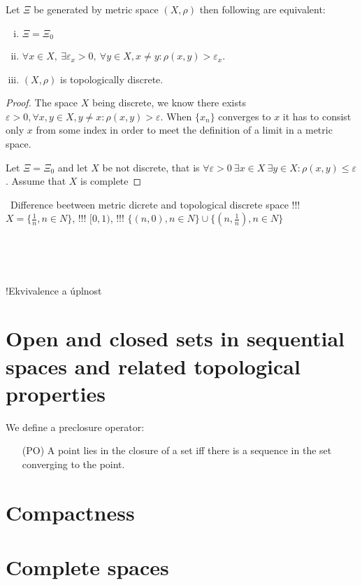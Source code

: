 \begin{theorem} \label{th:xieqxi0}
Let $\Xi$ be generated by metric space $(X,\rho)$ then following are equivalent:
\begin{enumerate}[(i)]
	\item $\Xi=\Xi_0$
	\item $\forall x\in X,\ \exists \varepsilon_x>0,\ \forall y\in X, x\neq y: \rho(x,y)>\varepsilon_x$.
	\item $(X,\rho)$ is topologically discrete.
\end{enumerate}
\end{theorem} 

\begin{proof}
	The space $X$ being discrete, we know there exists $\varepsilon >0, \forall x,y\in X, y\neq x: \rho(x,y)>\varepsilon$.
	When $\{x_n\}$ converges to $x$ it has to consist only $x$ from some index in order to meet the definition of a limit in a metric space.
	
	Let $\Xi=\Xi_0$ and let $X$ be not discrete, that is $\forall \varepsilon>0\ \exists x\in X\ \exists y\in X: \rho(x,y)\leq \varepsilon$. Assume that $X$ is complete
\end{proof}

\begin{example}
	\tbd\ Difference beetween metric dicrete and topological discrete space !!! $X=\{\frac{1}{n}, n\in N\}$, !!! $[0,1)$, !!! $\{(n,0), n\in N\}\cup\{(n,\frac{1}{n}), n\in N\}$
\end{example}


\

\

!Ekvivalence a úplnost


\section{Open and closed sets in sequential spaces and related topological properties}

We define a preclosure operator:
\begin{enumerate}
	\item[(PO)] A point lies in the closure of a set iff there is a sequence in the set converging to the point.
\end{enumerate}

\section{Compactness}

\section{Complete spaces}


